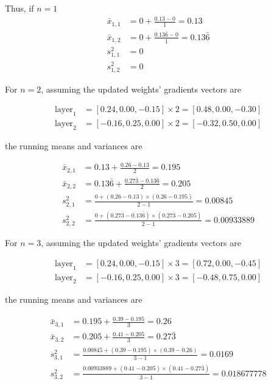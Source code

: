\documentclass[MSc,english,french]{ulthese}
\begin{document}
Thus, if $n = 1$
\begin{align*}
\bar{x}_{1, 1} &= 0 + \frac{0.13 - 0}{1} = 0.13 \\
\bar{x}_{1, 2} &= 0 + \frac{0.13\bar{6} - 0}{1} = 0.13\bar{6}  \\
s^2_{1, 1} &= 0 \\
s^2_{1, 2} &= 0
\end{align*}

For $n=2$, assuming the updated weights' gradients vectors are 

\begin{align*}
\text{layer}_1 &= [ 0.24, 0.00, -0.15] \times 2 = [ 0.48, 0.00, -0.30] \\
\text{layer}_2 &= [-0.16, 0.25, 0.00] \times 2 = [-0.32, 0.50, 0.00] 
\end{align*}

the running means and variances are

\begin{align*}
\bar{x}_{2, 1} &= 0.13 + \frac{0.26 - 0.13}{2} = 0.195 \\
\bar{x}_{2, 2} &= 0.13\bar{6} + \frac{0.27\bar{3} - 0.13\bar{6}}{2} =  0.205\\
s^2_{2, 1} &= \frac{0 + (0.26 - 0.13)\times(0.26 - 0.195)}{2 - 1} = 0.00845\\
s^2_{2, 2} &= \frac{0 + (0.27\bar{3} - 0.13\bar{6})\times(0.27\bar{3} - 0.205)}{2 - 1} = 0.00933889
\end{align*}

For $n=3$, assuming the updated weights' gradients vectors are  

\begin{align*}
\text{layer}_1 &= [ 0.24, 0.00, -0.15] \times 3 = [ 0.72, 0.00, -0.45] \\
\text{layer}_2 &= [-0.16, 0.25, 0.00] \times 3 = [-0.48, 0.75, 0.00] 
\end{align*}

the running means and variances are

\begin{align*}
\bar{x}_{3, 1} &= 0.195 + \frac{0.39 - 0.195}{3} = 0.26 \\
\bar{x}_{3, 2} &= 0.205 + \frac{0.41 - 0.205}{3} = 0.27\bar{3} \\
s^2_{3, 1} &= \frac{0.00845 + (0.39 - 0.195)\times(0.39 - 0.26)}{3 - 1} = 0.0169\\
s^2_{3, 2} &= \frac{0.00933889 + (0.41 - 0.205)\times(0.41 - 0.27\bar{3})}{3 - 1} = 0.018677778
\end{align*}


\end{document}
